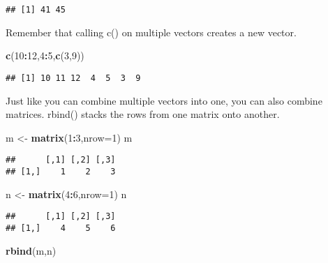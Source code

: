 \documentclass[
]{article}
\newenvironment{Shaded}{\begin{snugshade}}{\end{snugshade}}
\newcommand{\DataTypeTok}[1]{\textcolor[rgb]{0.13,0.29,0.53}{#1}}
\newcommand{\DecValTok}[1]{\textcolor[rgb]{0.00,0.00,0.81}{#1}}
\newcommand{\KeywordTok}[1]{\textcolor[rgb]{0.13,0.29,0.53}{\textbf{#1}}}
\newcommand{\NormalTok}[1]{#1}
\newcommand{\OperatorTok}[1]{\textcolor[rgb]{0.81,0.36,0.00}{\textbf{#1}}}
\newcommand{\StringTok}[1]{\textcolor[rgb]{0.31,0.60,0.02}{#1}}
\begin{document}
\begin{verbatim}
## [1] 41 45
\end{verbatim}

Remember that calling c() on multiple vectors creates a new vector.

\begin{Shaded}
\begin{Highlighting}[]
\KeywordTok{c}\NormalTok{(}\DecValTok{10}\OperatorTok{:}\DecValTok{12}\NormalTok{,}\DecValTok{4}\OperatorTok{:}\DecValTok{5}\NormalTok{,}\KeywordTok{c}\NormalTok{(}\DecValTok{3}\NormalTok{,}\DecValTok{9}\NormalTok{))}
\end{Highlighting}
\end{Shaded}

\begin{verbatim}
## [1] 10 11 12  4  5  3  9
\end{verbatim}

Just like you can combine multiple vectors into one, you can also
combine matrices. rbind() stacks the rows from one matrix onto another.

\begin{Shaded}
\begin{Highlighting}[]
\NormalTok{m <-}\StringTok{ }\KeywordTok{matrix}\NormalTok{(}\DecValTok{1}\OperatorTok{:}\DecValTok{3}\NormalTok{,}\DataTypeTok{nrow=}\DecValTok{1}\NormalTok{)}
\NormalTok{m}
\end{Highlighting}
\end{Shaded}

\begin{verbatim}
##      [,1] [,2] [,3]
## [1,]    1    2    3
\end{verbatim}

\begin{Shaded}
\begin{Highlighting}[]
\NormalTok{n <-}\StringTok{ }\KeywordTok{matrix}\NormalTok{(}\DecValTok{4}\OperatorTok{:}\DecValTok{6}\NormalTok{,}\DataTypeTok{nrow=}\DecValTok{1}\NormalTok{)}
\NormalTok{n}
\end{Highlighting}
\end{Shaded}

\begin{verbatim}
##      [,1] [,2] [,3]
## [1,]    4    5    6
\end{verbatim}

\begin{Shaded}
\begin{Highlighting}[]
\KeywordTok{rbind}\NormalTok{(m,n)}
\end{Highlighting}
\end{Shaded}
\end{document}
